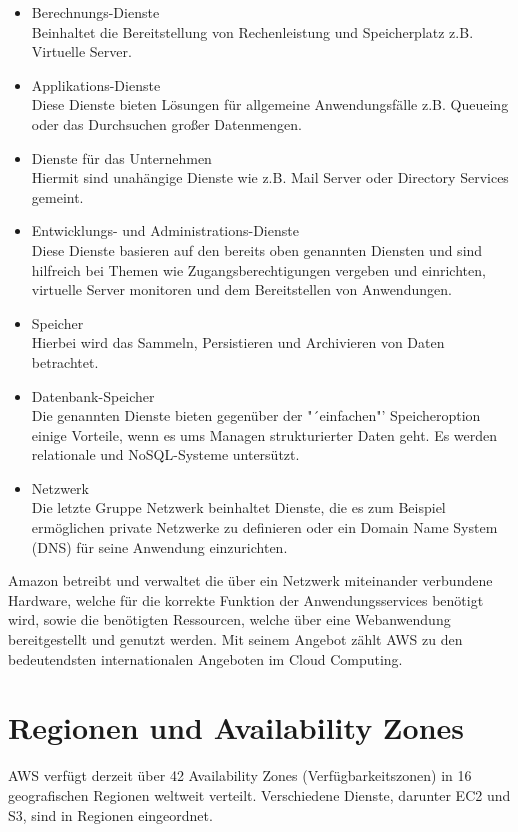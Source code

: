{\begin{itemize}
  \item Berechnungs-Dienste
  \\ Beinhaltet die Bereitstellung von Rechenleistung und Speicherplatz z.B. Virtuelle Server.
  \item Applikations-Dienste
  \\ Diese Dienste bieten Lösungen für allgemeine Anwendungsfälle z.B. Queueing oder das Durchsuchen großer Datenmengen.
  \item Dienste für das Unternehmen
  \\ Hiermit sind unahängige Dienste wie z.B. Mail Server oder Directory Services gemeint.
  \item Entwicklungs- und Administrations-Dienste
  \\ Diese Dienste basieren auf den bereits oben genannten Diensten und sind hilfreich bei Themen wie Zugangsberechtigungen vergeben und einrichten, virtuelle Server monitoren und dem Bereitstellen von Anwendungen.
  \item Speicher
  \\ Hierbei wird das Sammeln, Persistieren und Archivieren von Daten betrachtet.
  \item Datenbank-Speicher
  \\ Die genannten Dienste bieten gegenüber der "´einfachen"' Speicheroption einige Vorteile, wenn es ums Managen strukturierter Daten geht. Es werden relationale und NoSQL-Systeme untersützt.
  \item Netzwerk
  \\ Die letzte Gruppe Netzwerk beinhaltet Dienste, die es zum Beispiel ermöglichen private Netzwerke zu definieren oder ein Domain Name System (DNS) für seine Anwendung einzurichten.
\end{itemize} \cite{wittig:awsinaction}

Amazon betreibt und verwaltet
die über ein Netzwerk miteinander verbundene Hardware, welche für die korrekte
Funktion der Anwendungsservices benötigt wird, sowie die benötigten Ressourcen,
welche über eine Webanwendung bereitgestellt und genutzt werden. Mit seinem Angebot
zählt AWS zu den bedeutendsten internationalen Angeboten im Cloud Computing.


\section{Regionen und Availability Zones}
\label{sec:regions}
AWS verfügt derzeit über 42 Availability Zones (Verfügbarkeitszonen) in 16 geografischen Regionen weltweit verteilt. Verschiedene Dienste, darunter EC2 und S3, sind in Regionen eingeordnet.

}
